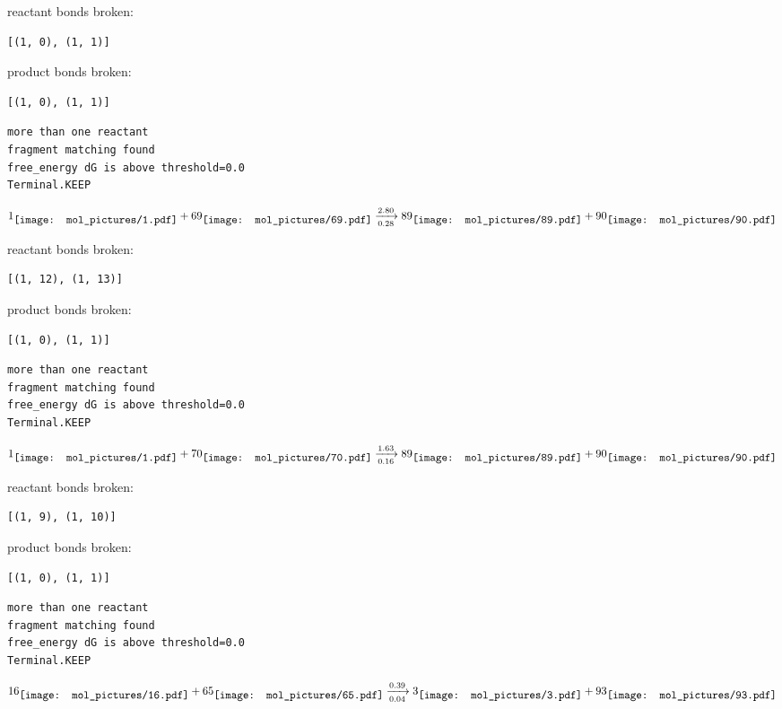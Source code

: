 \documentclass{article}
\begin{document}
reactant bonds broken:\begin{verbatim}
[(1, 0), (1, 1)]
\end{verbatim}
product bonds broken:\begin{verbatim}
[(1, 0), (1, 1)]
\end{verbatim}




\vspace{1cm}
\begin{verbatim}
more than one reactant
fragment matching found
free_energy dG is above threshold=0.0
Terminal.KEEP
\end{verbatim}
$$
1
\raisebox{-.5\height}{\texttt{[image: mol\_pictures/1.pdf]}}
+
69
\raisebox{-.5\height}{\texttt{[image: mol\_pictures/69.pdf]}}
\xrightarrow[0.28]{2.80}
89
\raisebox{-.5\height}{\texttt{[image: mol\_pictures/89.pdf]}}
+
90
\raisebox{-.5\height}{\texttt{[image: mol\_pictures/90.pdf]}}
$$


reactant bonds broken:\begin{verbatim}
[(1, 12), (1, 13)]
\end{verbatim}
product bonds broken:\begin{verbatim}
[(1, 0), (1, 1)]
\end{verbatim}




\vspace{1cm}
\begin{verbatim}
more than one reactant
fragment matching found
free_energy dG is above threshold=0.0
Terminal.KEEP
\end{verbatim}
$$
1
\raisebox{-.5\height}{\texttt{[image: mol\_pictures/1.pdf]}}
+
70
\raisebox{-.5\height}{\texttt{[image: mol\_pictures/70.pdf]}}
\xrightarrow[0.16]{1.63}
89
\raisebox{-.5\height}{\texttt{[image: mol\_pictures/89.pdf]}}
+
90
\raisebox{-.5\height}{\texttt{[image: mol\_pictures/90.pdf]}}
$$


reactant bonds broken:\begin{verbatim}
[(1, 9), (1, 10)]
\end{verbatim}
product bonds broken:\begin{verbatim}
[(1, 0), (1, 1)]
\end{verbatim}




\vspace{1cm}
\begin{verbatim}
more than one reactant
fragment matching found
free_energy dG is above threshold=0.0
Terminal.KEEP
\end{verbatim}
$$
16
\raisebox{-.5\height}{\texttt{[image: mol\_pictures/16.pdf]}}
+
65
\raisebox{-.5\height}{\texttt{[image: mol\_pictures/65.pdf]}}
\xrightarrow[0.04]{0.39}
3
\raisebox{-.5\height}{\texttt{[image: mol\_pictures/3.pdf]}}
+
93
\raisebox{-.5\height}{\texttt{[image: mol\_pictures/93.pdf]}}
$$
\end{document}
